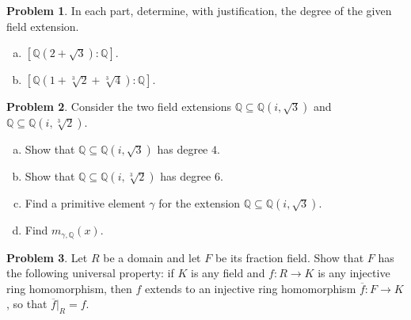 \documentclass[11pt]{article}
\newcommand{\Q}{\mathbb{Q}}
\theoremstyle{definition}
\newtheorem{problem}{Problem}
\begin{document}
\begin{problem}
In each part, determine, with justification, the degree of the given field extension.
\begin{enumerate}[a)]
\item $[\Q(2 + \sqrt{3}) : \Q]$.
\item $[\Q(1 + \sqrt[3]{2}+\sqrt[3]{4}) : \Q]$.
\end{enumerate}
\end{problem}





\begin{problem}
Consider the two field extensions $\Q \subseteq \Q(i, \sqrt{3})$ and
$\Q \subseteq \Q(i, \sqrt[3]{2})$.

\begin{enumerate}[a)]
\item Show that $\Q \subseteq \Q(i, \sqrt{3})$ has degree $4$. 

\item Show that $\Q \subseteq \Q(i, \sqrt[3]{2})$ has degree $6$.
  
\item Find a primitive element $\gamma$ for the extension $\Q \subseteq \Q(i, \sqrt{3})$.

\item Find $m_{\gamma, \Q}(x)$.
\end{enumerate}
\end{problem}


\begin{problem}
	Let $R$ be a domain and let $F$ be its fraction field. Show that $F$ has the following universal property: if $K$ is any field and $f\!: R \to K$ is any injective ring homomorphism, then $f$ extends to an injective ring homomorphism $\overline{f}\!: F \to K$, so that $\overline{f}|_R=f$.
\end{problem}
\end{document}
